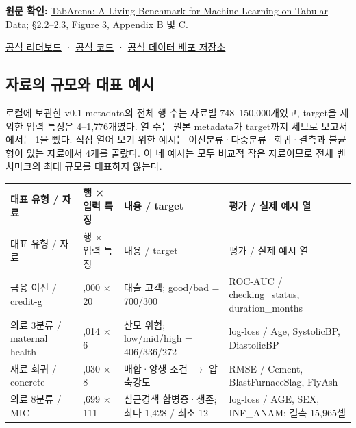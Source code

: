 {\small\textbf{원문 확인:} \href{https://arxiv.org/abs/2506.16791}{TabArena: A Living Benchmark for Machine Learning on Tabular Data}; §2.2–2.3, Figure 3, Appendix B 및 C.}\par

\href{https://huggingface.co/spaces/TabArena/leaderboard}{공식 리더보드} · \href{https://github.com/TabArena/tabarena}{공식 코드} · \href{https://huggingface.co/datasets/TabArena/BeyondArena}{공식 데이터 배포 저장소}


\subsection{자료의 규모와 대표 예시}

로컬에 보관한 v0.1 metadata의 전체 행 수는 자료별 748–150,000개였고, target을 제외한 입력 특징은 4–1,776개였다. 열 수는 원본 metadata가 target까지 세므로 보고서에서는 1을 뺐다. 직접 열어 보기 위한 예시는 이진분류·다중분류·회귀·결측과 불균형이 있는 자료에서 4개를 골랐다. 이 네 예시는 모두 비교적 작은 자료이므로 전체 벤치마크의 최대 규모를 대표하지 않는다.


\begingroup
\footnotesize
\begin{longtable}{>{\raggedright\arraybackslash}p{}>{\raggedright\arraybackslash}p{}>{\raggedright\arraybackslash}p{}>{\raggedright\arraybackslash}p{}}
\toprule
대표 유형 /\allowbreak{} 자료 & 행 × 입력 특징 & 내용 /\allowbreak{} target & 평가 /\allowbreak{} 실제 예시 열 \\ \midrule
\endfirsthead
대표 유형 /\allowbreak{} 자료 & 행 × 입력 특징 & 내용 /\allowbreak{} target & 평가 /\allowbreak{} 실제 예시 열 \\ \midrule
\endhead
{}금융 이진 /\allowbreak{} credit-g & 1,000 × 20 & 대출 고객; good/\allowbreak{}bad =\allowbreak{} 700/\allowbreak{}300 & ROC-AUC /\allowbreak{} checking\_\allowbreak{}status, duration\_\allowbreak{}months \\
{}의료 3분류 /\allowbreak{} maternal health & 1,014 × 6 & 산모 위험; low/\allowbreak{}mid/\allowbreak{}high =\allowbreak{} 406/\allowbreak{}336/\allowbreak{}272 & log-loss /\allowbreak{} Age, SystolicBP, DiastolicBP \\
{}재료 회귀 /\allowbreak{} concrete & 1,030 × 8 & 배합·양생 조건  \ensuremath{\rightarrow}  압축강도 & RMSE /\allowbreak{} Cement, BlastFurnaceSlag, FlyAsh \\
{}의료 8분류 /\allowbreak{} MIC & 1,699 × 111 & 심근경색 합병증·생존; 최다 1,428 /\allowbreak{} 최소 12 & log-loss /\allowbreak{} AGE, SEX, INF\_\allowbreak{}ANAM; 결측 15,965셀 \\
\bottomrule
\end{longtable}
\endgroup


